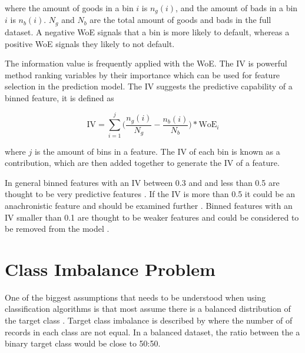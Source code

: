 where the amount of goods in a bin $i$ is $n_g(i)$, and the amount of bads in a bin $i$ is $n_b(i)$. $N_g$ and $N_b$ are the total amount of goods and bads in the full dataset. A negative WoE signals that a bin is more likely to default, whereas a positive WoE signals they likely to not default.

The information value is frequently applied with the WoE. The IV is powerful method ranking variables by their importance which can be used for feature selection in the prediction model. The IV suggests the predictive capability of a binned feature, it is defined as  
 
\begin{equation} \label{eq:informatoValue}
\text{IV} =  \sum\limits_{i=1}^j \bigg(\frac{n_g(i)}{N_g} -   \frac{n_b(i)}{N_b}\bigg) * \text{WoE$_i$}
\end{equation}

where $j$ is the amount of bins in a feature. The IV of each bin is known as a contribution, which are then added together to generate the IV of a feature.

In general binned features with an IV between 0.3 and and less than 0.5 are thought to be very predictive features \citep{mays_credit_2004}. If the IV is more than 0.5 it could be an anachronistic feature and should be examined further \citep{siddiqi_credit_2012}. Binned features with an IV smaller than 0.1 are thought to be weaker features and could be considered to be removed from the model \citep{anderson_credit_2007}.

\begin{comment}
\subsection{Correlation-based Feature Selection}
\subsection{Information Gain}
\subsection{Coarse Classification/ Binning}
\end{comment}

\section{Class Imbalance Problem}\label{sec:imBalance}
One of the biggest assumptions that needs to be understood when using classification algorithms is that most assume there is a balanced distribution of the target class \citep{japkowicz_class_2000}. Target class imbalance is described by  \citep{chawla_smote:_2002} where the number of  of records in each class are not equal. In a balanced dataset, the ratio between the a binary target class would be close to 50:50. 

